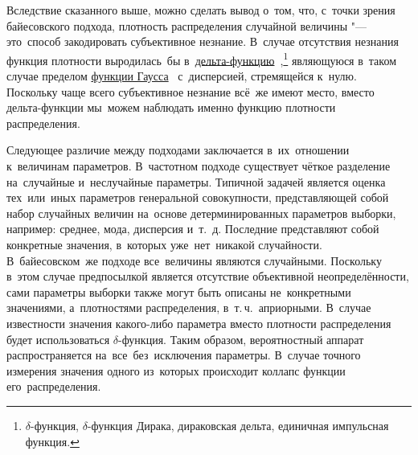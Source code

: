 \documentclass[]{scrartcl}
\begin{document}
Вследствие сказанного выше, можно сделать вывод о~том, что, с~точки зрения байесовского подхода, плотность распределения случайной величины "--- это~способ закодировать субъективное незнание. В~случае отсутствия незнания функция плотности выродилась~бы в~\href{https://ru.wikipedia.org/wiki/Дельта-функцию}{дельта-функцию}~\cite{Wiki:delta-function},\footnote{$\delta$-функция, $\delta$-функция Дирака, дираковская дельта, единичная импульсная функция.} являющуюся в~таком случае пределом \href{https://ru.wikipedia.org/wiki/Гауссова_функция}{функции Гаусса}~\cite{Wiki:Gauss-function} с~дисперсией, стремящейся к~нулю. Поскольку чаще всего субъективное незнание  всё~же имеют место, вместо дельта-функции  мы~можем наблюдать именно функцию плотности распределения.

Следующее различие между подходами заключается в~их~отношении к~величинам параметров. В~частотном подходе существует чёткое разделение на~случайные и~неслучайные параметры. Типичной задачей является оценка тех~или~иных параметров генеральной совокупности, представляющей собой набор случайных величин на~основе детерминированных параметров выборки, например: среднее, мода, дисперсия и~т.~д. Последние представляют собой конкретные значения, в~которых уже~нет~никакой случайности. В~байесовском~же подходе все~величины являются случайными. Поскольку в~этом случае предпосылкой является отсутствие объективной неопределённости, сами параметры выборки также могут быть описаны не~конкретными значениями, а~плотностями распределения, в~т.\,ч.~априорными. В~случае известности значения какого-либо параметра вместо плотности распределения будет использоваться $\delta$-функция. Таким образом, вероятностный аппарат распространяется на~все~без~исключения параметры. В~случае точного измерения значения одного из~которых происходит коллапс функции его~распределения.
\end{document}
